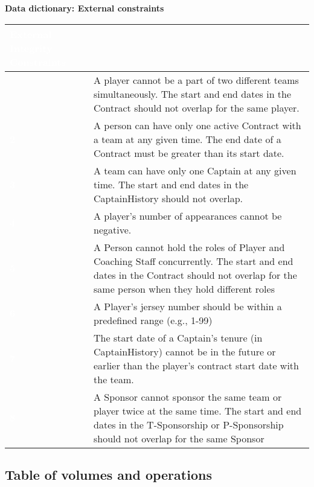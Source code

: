 \pagebreak

{\centering \textbf{Data dictionary: External constraints}\\}
\begin{table}[H]
  \def\arraystretch{1.25}%
  \centering
  \begin{tabular}{|>{\columncolor{myColor}}  m{1.5cm} | m{13.5cm}| }
    \hline
    \rowcolor{myColor}
    \multicolumn{2}{| c |}  {\textcolor{white}{\large \textbf{External Integrity Constraints}}} \\
    \hline
     {\textcolor{white}{\textbf{1}}} & A player cannot be a part of two different teams simultaneously. The start and end dates in the Contract should not overlap for the same player. \\
    \hline
     {\textcolor{white}{\textbf{2}}} & A person can have only one active Contract with a team at any given time. The end date of a Contract must be greater than its start date.\\
    \hline
     {\textcolor{white}{\textbf{3}}} & A team can have only one Captain at any given time. The start and end dates in the CaptainHistory should not overlap. \\
    \hline
     {\textcolor{white}{\textbf{4}}} & A player’s number of appearances cannot be negative.\\
    \hline
     {\textcolor{white}{\textbf{5}}} & A Person cannot hold the roles of Player and Coaching Staff concurrently. The start and end dates in the Contract should not overlap for the same person when they hold different roles\\
    \hline
     {\textcolor{white}{\textbf{6}}} &A Player’s jersey number should be within a predefined range (e.g., 1-99) \\
    \hline
     {\textcolor{white}{\textbf{7}}} & The start date of a Captain’s tenure (in CaptainHistory) cannot be in the future or earlier than the player’s contract start date with the team.\\
    \hline
    {\textcolor{white}{\textbf{8}}} & A Sponsor cannot sponsor the same team or player twice at the same time. The start and end dates in the T-Sponsorship or P-Sponsorship should not overlap for the same Sponsor \\
    \hline
  \end{tabular}\label{tab:table5}
\end{table}

\pagebreak

\subsection{Table of volumes and operations}\label{subsec:table-of-volumes-and-operations}

